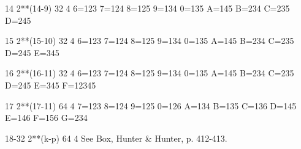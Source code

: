       14      2**(14-9)   32      4     6=123 7=124
                                        8=125 9=134
                                        0=135 A=145
                                        B=234 C=235
                                        D=245
 
      15      2**(15-10)  32      4     6=123 7=124
                                        8=125 9=134
                                        0=135 A=145
                                        B=234 C=235
                                        D=245 E=345
 
      16      2**(16-11)  32      4     6=123 7=124
                                        8=125 9=134
                                        0=135 A=145
                                        B=234 C=235
                                        D=245 E=345
                                        F=12345
 
      17      2**(17-11)  64      4     7=123 8=124
                                        9=125 0=126
                                        A=134 B=135
                                        C=136 D=145
                                        E=146 F=156
                                        G=234
 
      18-32   2**(k-p)    64      4     See Box,
                                        Hunter &
                                        Hunter, p.
                                        412-413.
